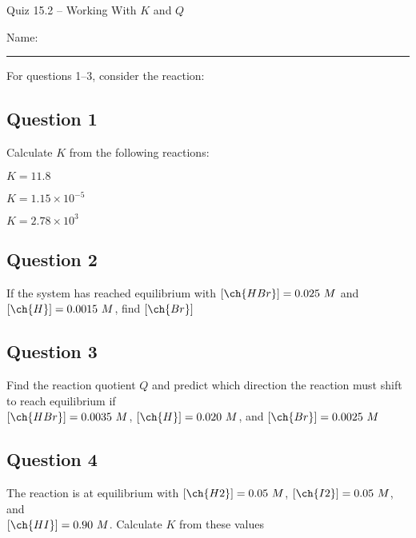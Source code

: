 \documentclass[11pt, letterpaper]{memoir}
\begin{document}
	\begin{center}
		{\large	Quiz 15.2 -- Working With $K$ and $Q$}
	\end{center}
	{\large Name: \rule[-1mm]{4in}{.1pt} 
	
	
	\noindent	
	For questions 1--3, consider the reaction: 
	
	\subsection*{Question 1}
	Calculate $K$ from the following reactions:
	
	 \hspace{1em} $K=11.8$
	
	 \hspace{1em} $K=1.15\times10^{-5}$
	
	 \hspace{1em} $K=2.78\times10^{3}$
	

	\vspace{6em}
	\subsection*{Question 2}
	If the system has reached equilibrium with $\left[\ch{HBr}\right]=0.025~M$ and  $\left[\ch{H}\right]=0.0015~M$, find  $\left[\ch{Br}\right]$
	
	\vspace{3em}
	\subsection*{Question 3}
	Find the reaction quotient $Q$ and predict which direction the reaction must shift to reach equilibrium if \\ $\left[\ch{HBr}\right]=0.0035~M$,  $\left[\ch{H}\right]=0.020~M$, and  $\left[\ch{Br}\right]=0.0025~M$
	
	\vspace{3em}
	\subsection*{Question 4}
	The reaction  is at equilibrium with  $\left[\ch{H2}\right]=0.05~M$,  $\left[\ch{I2}\right]=0.05~M$, and  \\$\left[\ch{HI}\right]=0.90~M$. Calculate $K$ from these values
	
	\vspace{3em}
}
\end{document}
